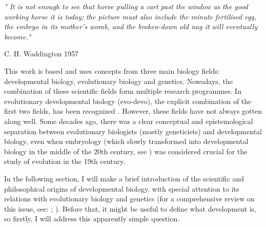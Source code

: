 \setlength{\epigraphrule}{0\p@}
\setlength{\epigraphwidth}{.7\textwidth}
\epigraph{\textit{" It is not enough to see that horse pulling a cart past
the window as the good working horse it is today; the picture
must also include the minute fertilised egg, the embryo in its
mother's womb, and the broken-down old nag it will eventually
become."}}{C. H. Waddington 1957}

This work is based and uses concepts from three main biology fields: 
developmental biology, evolutionary biology and genetics.
Nowadays, the combination of these scientific fields form multiple research programmes. 
In evolutionary developmental biology (evo-devo), the explicit combination of the first two fields, has been recognized \citep{Muller2007}.
However, these fields have not always gotten along well. 
Some decades ago, there was a clear conceptual and epistemological separation between evolutionary biologists (mostly geneticists) and developmental biology, even when embryology (which slowly transformed into developmental biology in the middle of the 20th century, see \citealp{Horder2010}) was considered crucial for the study of evolution in the 19th century.

In the following section, I will make a brief introduction of the scientific and philosophical origins of developmental biology, with special attention to its relations with evolutionary biology and genetics (for a comprehensive review on this issue, see: \citealp{amundson2005changing}; \citealp{gilbert1991conceptual}).
Before that, it might be useful to define what development is, so firstly, I will address this apparently simple question.